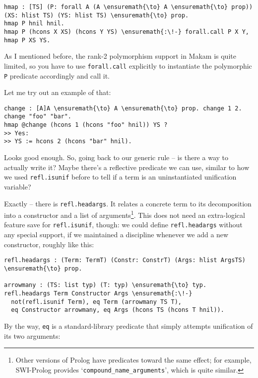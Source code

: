 \begin{verbatim}
hmap : [TS] (P: forall A (A \ensuremath{\to} A \ensuremath{\to} prop)) (XS: hlist TS) (YS: hlist TS) \ensuremath{\to} prop.
hmap P hnil hnil.
hmap P (hcons X XS) (hcons Y YS) \ensuremath{:\!-} forall.call P X Y, hmap P XS YS.
\end{verbatim}

\noindent
As I mentioned before, the rank-2 polymorphism support in Makam is quite
limited, so you have to use \texttt{forall.call} explicitly to
instantiate the polymorphic \texttt{P} predicate accordingly and call
it.

\heroSTUDENT{} Let me try out an example of that:

\begin{verbatim}
change : [A]A \ensuremath{\to} A \ensuremath{\to} prop. change 1 2. change "foo" "bar".
hmap @change (hcons 1 (hcons "foo" hnil)) YS ?
>> Yes:
>> YS := hcons 2 (hcons "bar" hnil).
\end{verbatim}

\noindent
Looks good enough. So, going back to our generic rule -- is there a way
to actually write it? Maybe there's a reflective predicate we can use,
similar to how we used \texttt{refl.isunif} before to tell if a term is
an uninstantiated unification variable?

\heroADVISOR{} Exactly -- there is \texttt{refl.headargs}. It relates a
concrete term to its decomposition into a constructor and a list of
arguments\footnote{Other versions of Prolog have predicates toward the same effect; for example, SWI-Prolog \citep{wielemaker2012swi} provides `\texttt{compound\_{}name\_{}arguments}', which is quite similar.}.
This does not need an extra-logical feature save for
\texttt{refl.isunif}, though: we could define \texttt{refl.headargs}
without any special support, if we maintained a discipline whenever we
add a new constructor, roughly like this:

\begin{verbatim}
refl.headargs : (Term: TermT) (Constr: ConstrT) (Args: hlist ArgsTS) \ensuremath{\to} prop.

arrowmany : (TS: list typ) (T: typ) \ensuremath{\to} typ.
refl.headargs Term Constructor Args \ensuremath{:\!-}
  not(refl.isunif Term), eq Term (arrowmany TS T),
  eq Constructor arrowmany, eq Args (hcons TS (hcons T hnil)).
\end{verbatim}

By the way, \texttt{eq} is a standard-library predicate that simply
attempts unification of its two arguments:

